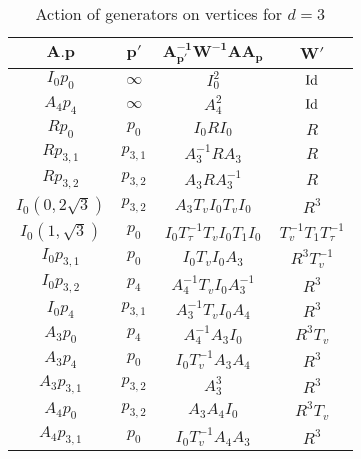 \documentclass{article}[12pt]
\begin{document}
\begin{table}[h]\label{d=3table}
  \begin{center}
  {\renewcommand{\arraystretch}{1.2}%
\begin{tabular}{|c|c|c|c|}
\hline 
$\mathbf{A.p}$ & $\mathbf{p'}$ & $\mathbf{A_{p'}^{-1}W^{-1}A A_p}$ & $\mathbf{W'}$  \\
\hline

$I_0 p_0$ & $\infty$ & $I_0^2$ & ${\rm Id}$\\
\hline

$A_4 p_4$ & $\infty$ & $A_4^2$ & ${\rm Id}$\\
\hline

$R p_0$ & $p_0$ & $I_0RI_0$ & $R$\\
\hline

$R p_{3,1}$ & $p_{3,1}$ & $A_3^{-1}RA_3$ & $R$\\
\hline

$R p_{3,2}$ & $p_{3,2}$ & $A_3RA_3^{-1}$& $R$\\
\hline

$I_0 (0,2\sqrt{3})$ & $p_{3,2}$ & $A_3T_vI_0T_vI_0$ & $R^3$\\
\hline

$I_0 (1,\sqrt{3})$ & $p_0$ & $I_0T_\tau ^{-1}T_vI_0T_1I_0$ & $T_v^{-1}T_1T_\tau ^{-1}$\\
\hline

$I_0 p_{3,1}$ & $p_0$ & $I_0T_vI_0A_3$ & $R^3T_v^{-1}$\\
\hline

$I_0 p_{3,2}$ & $p_4$ & $A_4^{-1}T_vI_0A_3^{-1}$ & $R^3$\\
\hline

$I_0 p_4$ & $p_{3,1}$ & $A_3^{-1}T_vI_0A_4$ & $R^3$\\
\hline

$A_3  p_0$ & $p_4$ & $A_4^{-1}A_3I_0$ & $R^3T_v$ \\
\hline

$A_3  p_4$ & $p_0$ & $I_0T_v^{-1}A_3A_4$ &  $R^3 $ \\
\hline

$A_3  p_{3,1}$ & $p_{3,2}$ & $A_3^3$ &  $R^3 $ \\
\hline

$A_4  p_{0}$ & $p_{3,2}$ & $A_3A_4I_0$ &  $R^3T_v$ \\
\hline

$A_4  p_{3,1}$ & $p_0$ & $I_0T_v^{-1}A_4A_3$ &  $R^3$ \\
\hline

\end{tabular}
}
\end{center}
\caption{Action of generators on vertices for $d=3$}
\end{table}
\end{document}
